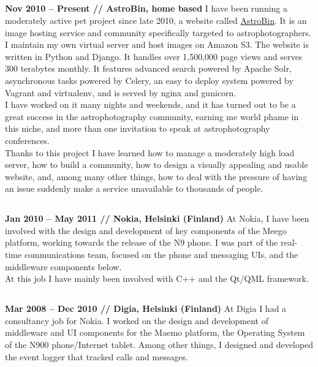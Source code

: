 \documentclass[10pt]{tccv}
\begin{document}
			\subsection{}
				\textbf{Nov 2010 -- Present // AstroBin, home based}
				I have been running a moderately active pet project since late
				2010, a website called \href{http://astrobin.com}{AstroBin}.
				It is an image hosting service and community specifically
				targeted to astrophotographers. I maintain my own virtual
				server and host images on Amazon S3. The website is written in
				Python and Django. It handles over 1,500,000 page views and
				serves 300 terabytes monthly. It features advanced search
				powered by Apache Solr, asynchronous tasks powered by Celery,
				an easy to deploy system powered by Vagrant and virtualenv, and
				is served by nginx and gunicorn.\\

				I have worked on it many nights and weekends, and it has turned
				out to be a great success in the astrophotography community,
				earning me world phame in this niche, and more than one
				invitation to speak at astrophotography conferences.\\

				Thanks to this project I have learned how to manage a
				moderately high load server, how to build a community, how to
				design a visually appealing and usable website, and, among many
				other things, how to deal with the pressure of having an issue
				suddenly make a service unavailable to thousands of people.

			\subsection{}
				\textbf{Jan 2010 -- May 2011 // Nokia, Helsinki (Finland)} At
				Nokia, I have been involved with the design and development of
				key components of the Meego platform, working towards the
				release of the N9 phone. I was part of the real-time
				communications team, focused on the phone and messaging UIs,
				and the middleware components below.\\

				At this job I have mainly been involved with C++ and the Qt/QML
				framework.

			\subsection{}
				\textbf{Mar 2008 -- Dec 2010 // Digia, Helsinki (Finland)} At
				Digia I had a consultancy job for Nokia. I worked on the design
				and development of middleware and UI components for the Maemo
				platform, the Operating System of the N900 phone/Internet
				tablet. Among other things, I designed and developed the event
				logger that tracked calls and messages.\\
\end{document}
